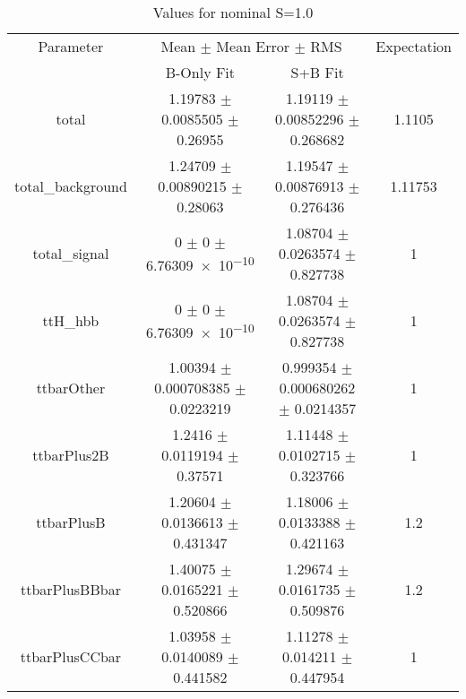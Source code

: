 \begin{table}
\centering
\caption{Values for nominal S=1.0}
\begin{tabular}{cccc}
\toprule
Parameter & \multicolumn{2}{c}{Mean $\pm$ Mean Error $\pm$ RMS} & Expectation\\
 & B-Only Fit & S+B Fit & \\
\midrule
total & \num{1.19783} $\pm$ \num{0.0085505} $\pm$ \num{0.26955} & \num{1.19119} $\pm$ \num{0.00852296} $\pm$ \num{0.268682} & \num{1.1105}\\
total\_background & \num{1.24709} $\pm$ \num{0.00890215} $\pm$ \num{0.28063} & \num{1.19547} $\pm$ \num{0.00876913} $\pm$ \num{0.276436} & \num{1.11753}\\
total\_signal & \num{0} $\pm$ \num{0} $\pm$ \num{6.76309e-10} & \num{1.08704} $\pm$ \num{0.0263574} $\pm$ \num{0.827738} & \num{1}\\
ttH\_hbb & \num{0} $\pm$ \num{0} $\pm$ \num{6.76309e-10} & \num{1.08704} $\pm$ \num{0.0263574} $\pm$ \num{0.827738} & \num{1}\\
ttbarOther & \num{1.00394} $\pm$ \num{0.000708385} $\pm$ \num{0.0223219} & \num{0.999354} $\pm$ \num{0.000680262} $\pm$ \num{0.0214357} & \num{1}\\
ttbarPlus2B & \num{1.2416} $\pm$ \num{0.0119194} $\pm$ \num{0.37571} & \num{1.11448} $\pm$ \num{0.0102715} $\pm$ \num{0.323766} & \num{1}\\
ttbarPlusB & \num{1.20604} $\pm$ \num{0.0136613} $\pm$ \num{0.431347} & \num{1.18006} $\pm$ \num{0.0133388} $\pm$ \num{0.421163} & \num{1.2}\\
ttbarPlusBBbar & \num{1.40075} $\pm$ \num{0.0165221} $\pm$ \num{0.520866} & \num{1.29674} $\pm$ \num{0.0161735} $\pm$ \num{0.509876} & \num{1.2}\\
ttbarPlusCCbar & \num{1.03958} $\pm$ \num{0.0140089} $\pm$ \num{0.441582} & \num{1.11278} $\pm$ \num{0.014211} $\pm$ \num{0.447954} & \num{1}\\
\bottomrule
\end{tabular}
\end{table}